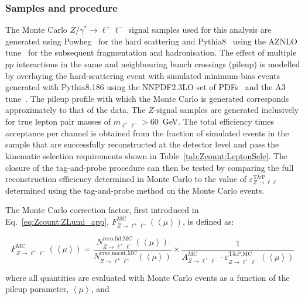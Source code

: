 \subsubsection{Samples and procedure}

The Monte Carlo $Z/\gamma^*\rightarrow\ell^+\ell^-$ signal samples used for this analysis are generated using Powheg~\cite{Nason:2004rx, Frixione:2007vw} for the hard scattering and Pythia8~\cite{Sjostrand:2014zea} using the AZNLO tune~\cite{ATLAS:2014alx} for the subsequent fragmentation and hadronisation. The effect of multiple $pp$ interactions in the same and neighbouring bunch crossings (pileup) is modelled by overlaying the hard-scattering event with simulated minimum-bias events generated with Pythia8.186 using the NNPDF2.3LO set of PDFs~\cite{Ball:2012cx} and the A3 tune~\cite{ATL-PHYS-PUB-2016-017}. The pileup profile with which the Monte Carlo is generated corresponds approximately to that of the data. The $Z$-signal samples are generated inclusively for true lepton pair masses of $m_{\ell^+\ell^-}>60$~GeV. The total efficiency times acceptance per channel is obtained from the fraction of simulated events in the sample that are successfully reconstructed at the detector level and pass the kinematic selection requirements shown in Table~\ref{tab:Zcount:LeptonSele}. The closure of the tag-and-probe procedure can then be tested by comparing the full reconstruction efficiency determined in Monte Carlo to the value of $\varepsilon^\text{T\&P}_{Z\rightarrow \ell\ell}$ determined using the tag-and-probe method on the Monte Carlo events.

The Monte Carlo correction factor, first introduced in Eq.~\ref{eq:Zcount:ZLumi_app}, $F^\text{MC}_{Z\rightarrow \ell^+\ell^-}(\left< \mu \right>)$, is defined as:

\begin{equation}
	F^\text{MC}_{Z\rightarrow \ell^+\ell^-}(\left< \mu \right>) = \frac{N^\text{reco,fid,MC}_{Z\rightarrow \ell^+\ell^-}(\left< \mu \right>)}{N^\text{true,nocut,MC}_{Z\rightarrow \ell^+\ell^-}(\left< \mu \right>)}\times\frac{1}{A^\text{MC}_{Z\rightarrow \ell^+\ell^-}\cdot \varepsilon^\text{T\&P,MC}_{Z\rightarrow \ell^+\ell^-}(\left< \mu \right>)}
	\label{eq:Zcount:MC factor}
\end{equation}

where all quantities are evaluated with Monte Carlo events as a function of the pileup parameter, $\left< \mu \right>$, and

